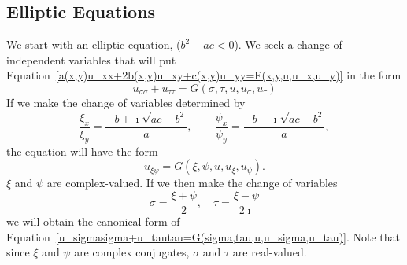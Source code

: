 \subsection{Elliptic Equations}



We start with an elliptic equation, ($b^2 - a c < 0$).
We seek a change of independent variables that will put 
Equation~\ref{a(x,y)u_xx+2b(x,y)u_xy+c(x,y)u_yy=F(x,y,u,u_x,u_y)}
in the form
\begin{equation}
  \label{u_sigmasigma+u_tautau=G(sigma,tau,u,u_sigma,u_tau)}
  u_{\sigma \sigma} + u_{\tau \tau} = G(\sigma, \tau, u, u_\sigma, u_\tau)
\end{equation}
If we make the change of variables determined by
\[
\frac{\xi_x}{\xi_y} = \frac{-b + \imath \sqrt{a c - b^2}}{a}, \qquad
\frac{\psi_x}{\psi_y} = \frac{-b - \imath \sqrt{a c - b^2}}{a},
\]
the equation will have the form
\[
u_{\xi \psi} = G(\xi, \psi, u, u_\xi, u_\psi).
\]
$\xi$ and $\psi$ are complex-valued.  If we then make the change of 
variables 
\[
\sigma = \frac{\xi + \psi}{2}, \quad
\tau = \frac{\xi - \psi}{2 \imath}
\]
we will obtain the canonical form of 
Equation~\ref{u_sigmasigma+u_tautau=G(sigma,tau,u,u_sigma,u_tau)}.
Note that since $\xi$ and $\psi$ are complex conjugates, $\sigma$ and $\tau$ are 
real-valued.





